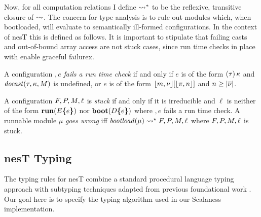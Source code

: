 Now, for all computation relations I define $\leadsto^*$ to be the reflexive, transitive closure
of $\leadsto$. The concern for type analysis is to rule out modules which, when bootloaded, will
evaluate to semantically ill-formed configurations. In the context of nesT this is defined as
follows. It is important to stipulate that failing casts and out-of-bound array access are not
stuck cases, since run time checks in place with enable graceful failurex.
\begin{definition}
  A configuration $\bm, e$ \emph{fails a run time check} if and only if $e$ is of the form
  $(\tau)\,\kappa$ and $\mathit{docast}(\tau,\kappa,M)$ is undefined, or $e$ is of the form
  $\lfloor m,{\nu} \rfloor[\lfloor \pi,n \rfloor]$ and $n\ge|\overline{{\nu}}|$.
\end{definition}

\begin{definition}
  \label{def-runnable}
  A configuration $F, P, M, \ell$ is \emph{stuck} if and only if it is irreducible
  and $\ell$ is neither of the form $\mathbf{run}(E\textup{\textbf{\{}} e\textup{\textbf{\}}})$ nor $\mathbf{boot}(D\textup{\textbf{\{}} e\textup{\textbf{\}}})$
  where $\bm, e$ fails a run time check. A runnable module $\mu$ \emph{goes wrong} iff
  $\mathit{bootload}(\mu) \leadsto^\star F, P, M, \ell $ where $F, P, M, \ell$
  is stuck.
\end{definition}

\subjudgefig

\coretypingfig

\declmodtypingfig

\subsection{nesT Typing} 
\label{section-nesttyping}

The typing rules for nesT combine a standard procedural language
typing approach with subtyping techniques adapted from previous
foundational work \cite{FramedML,Ghelli199875}. Our goal here is to specify
the typing algorithm used in our Scalaness implementation.

